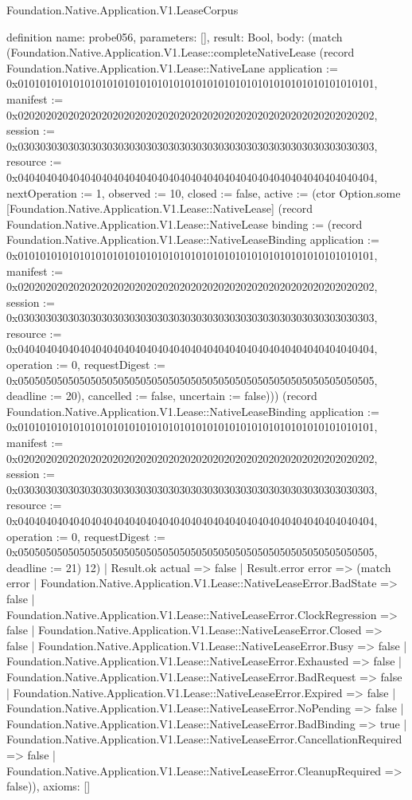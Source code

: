 \begin{lexlean}{Foundation.Native.Application.V1.LeaseCorpus}
\begin{semanticmodule}
definition{
  name: probe056,
  parameters: [],
  result: Bool,
  body: (match (Foundation.Native.Application.V1.Lease::completeNativeLease (record Foundation.Native.Application.V1.Lease::NativeLane {application := 0x0101010101010101010101010101010101010101010101010101010101010101, manifest := 0x0202020202020202020202020202020202020202020202020202020202020202, session := 0x0303030303030303030303030303030303030303030303030303030303030303, resource := 0x0404040404040404040404040404040404040404040404040404040404040404, nextOperation := 1, observed := 10, closed := false, active := (ctor Option.some [Foundation.Native.Application.V1.Lease::NativeLease] (record Foundation.Native.Application.V1.Lease::NativeLease {binding := (record Foundation.Native.Application.V1.Lease::NativeLeaseBinding {application := 0x0101010101010101010101010101010101010101010101010101010101010101, manifest := 0x0202020202020202020202020202020202020202020202020202020202020202, session := 0x0303030303030303030303030303030303030303030303030303030303030303, resource := 0x0404040404040404040404040404040404040404040404040404040404040404, operation := 0, requestDigest := 0x0505050505050505050505050505050505050505050505050505050505050505, deadline := 20}), cancelled := false, uncertain := false}))}) (record Foundation.Native.Application.V1.Lease::NativeLeaseBinding {application := 0x0101010101010101010101010101010101010101010101010101010101010101, manifest := 0x0202020202020202020202020202020202020202020202020202020202020202, session := 0x0303030303030303030303030303030303030303030303030303030303030303, resource := 0x0404040404040404040404040404040404040404040404040404040404040404, operation := 0, requestDigest := 0x0505050505050505050505050505050505050505050505050505050505050505, deadline := 21}) 12)
    | Result.ok actual => false
    | Result.error error => (match error
      | Foundation.Native.Application.V1.Lease::NativeLeaseError.BadState => false
      | Foundation.Native.Application.V1.Lease::NativeLeaseError.ClockRegression => false
      | Foundation.Native.Application.V1.Lease::NativeLeaseError.Closed => false
      | Foundation.Native.Application.V1.Lease::NativeLeaseError.Busy => false
      | Foundation.Native.Application.V1.Lease::NativeLeaseError.Exhausted => false
      | Foundation.Native.Application.V1.Lease::NativeLeaseError.BadRequest => false
      | Foundation.Native.Application.V1.Lease::NativeLeaseError.Expired => false
      | Foundation.Native.Application.V1.Lease::NativeLeaseError.NoPending => false
      | Foundation.Native.Application.V1.Lease::NativeLeaseError.BadBinding => true
      | Foundation.Native.Application.V1.Lease::NativeLeaseError.CancellationRequired => false
      | Foundation.Native.Application.V1.Lease::NativeLeaseError.CleanupRequired => false)),
  axioms: []
}


\end{semanticmodule}
\end{lexlean}
